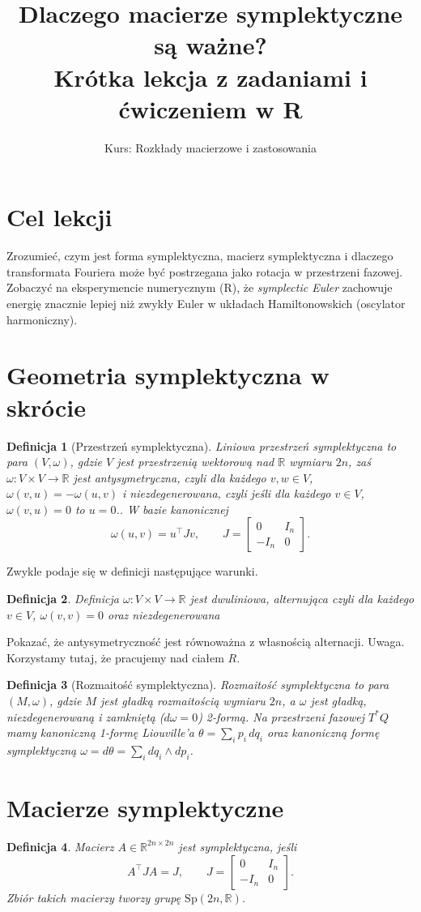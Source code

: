\documentclass[12pt]{article}
\title{Dlaczego macierze symplektyczne są ważne?\\ \large Krótka lekcja z zadaniami i ćwiczeniem w R}
\author{Kurs: Rozkłady macierzowe i zastosowania}
\date{}
\newtheorem{defi}{Definicja}
\newcommand{\R}{\mathbb{R}}
\newcommand{\Sp}{\mathrm{Sp}}
\begin{document}
\maketitle

\section*{Cel lekcji}
Zrozumieć, czym jest forma symplektyczna, macierz symplektyczna i dlaczego transformata Fouriera może być postrzegana jako rotacja w przestrzeni fazowej. Zobaczyć na eksperymencie numerycznym (R), że \emph{symplectic Euler} zachowuje energię znacznie lepiej niż zwykły Euler w układach Hamiltonowskich (oscylator harmoniczny).

\section{Geometria symplektyczna w skrócie}
\begin{defi}[Przestrzeń symplektyczna]
Liniowa przestrzeń symplektyczna to para $(V,\omega)$, gdzie $V$ jest przestrzenią wektorową nad $\R$ wymiaru $2n$, zaś $\omega:V\times V\to\R$ jest antysymetryczna, czyli dla każdego $v,w\in V$, $\omega(v,u)=-\omega(u,v)$ i niezdegenerowana, czyli jeśli dla każdego $v\in V$, $\omega(v,u)=0$ to $u=0$.. W bazie kanonicznej
\[
\omega(u,v) = u^\top J v,\qquad 
J=\begin{bmatrix}0&I_n\\ -I_n&0\end{bmatrix}.
\]
\end{defi}
 Zwykle podaje się w definicji następujące warunki. 
\begin{defi} Definicja
 $\omega:V\times V\to\R$ jest dwuliniowa, alternująca czyli dla każdego $v\in V$, $\omega(v,v)=0$ oraz  niezdegenerowana
 \end{defi}
Pokazać, że antysymetryczność jest równoważna z własnością alternacji. Uwaga. Korzystamy tutaj, że pracujemy nad ciałem $R$. 
 
\begin{defi}[Rozmaitość symplektyczna]
Rozmaitość symplektyczna to para $(M,\omega)$, gdzie $M$ jest gładką rozmaitością wymiaru $2n$, a $\omega$ jest gładką, niezdegenerowaną i zamkniętą ($d\omega=0$) 2-formą. Na przestrzeni fazowej $T^*Q$ mamy kanoniczną 1-formę Liouville’a $\theta=\sum_i p_i\,dq_i$ oraz kanoniczną formę symplektyczną $\omega=d\theta=\sum_i dq_i\wedge dp_i$.
\end{defi}

\section{Macierze symplektyczne}
\begin{defi}
Macierz $A\in\R^{2n\times 2n}$ jest \emph{symplektyczna}, jeśli
\[
A^\top J A = J,\qquad 
J=\begin{bmatrix}0&I_n\\ -I_n&0\end{bmatrix}.
\]
Zbiór takich macierzy tworzy grupę $\Sp(2n,\R)$.
\end{defi}
\end{document}
